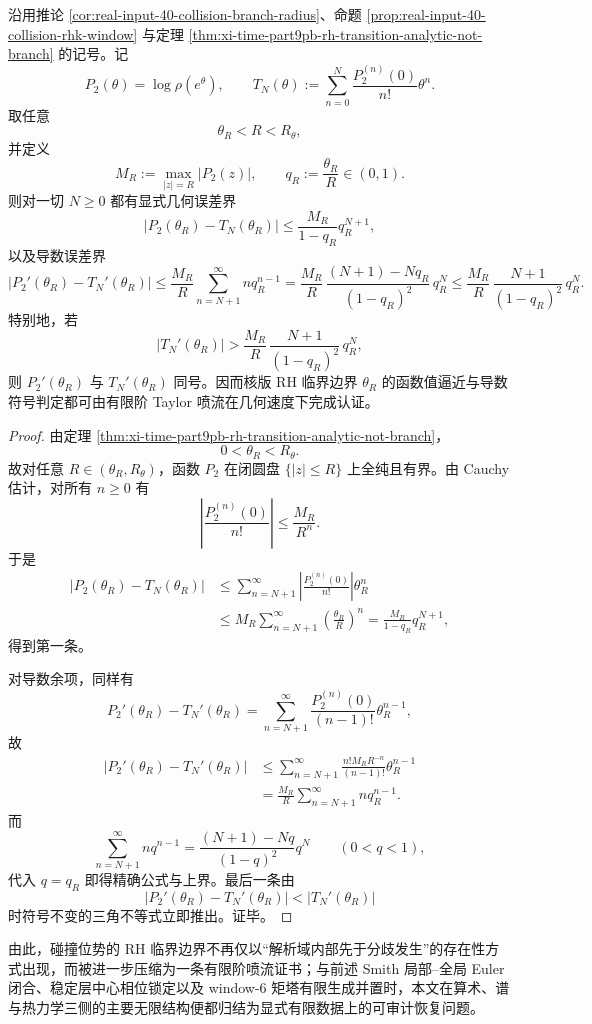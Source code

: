 \begin{theorem}\label{thm:xi-time-part50be-rh-boundary-finite-taylor-jet-certificate}
沿用推论 \ref{cor:real-input-40-collision-branch-radius}、命题 \ref{prop:real-input-40-collision-rhk-window} 与定理 \ref{thm:xi-time-part9pb-rh-transition-analytic-not-branch} 的记号。记
\[
P_2(\theta)=\log\rho(e^\theta),
\qquad
T_N(\theta):=\sum_{n=0}^{N}\frac{P_2^{(n)}(0)}{n!}\theta^n.
\]
取任意
\[
\theta_R<R<R_\theta,
\]
并定义
\[
M_R:=\max_{|z|=R}|P_2(z)|,
\qquad
q_R:=\frac{\theta_R}{R}\in(0,1).
\]
则对一切 \(N\ge 0\) 都有显式几何误差界
\[
\left|P_2(\theta_R)-T_N(\theta_R)\right|
\le
\frac{M_R}{1-q_R}q_R^{N+1},
\]
以及导数误差界
\[
\left|P_2'(\theta_R)-T_N'(\theta_R)\right|
\le
\frac{M_R}{R}\sum_{n=N+1}^{\infty}nq_R^{n-1}
=
\frac{M_R}{R}\,
\frac{(N+1)-Nq_R}{(1-q_R)^2}\,
q_R^{N}
\le
\frac{M_R}{R}\,
\frac{N+1}{(1-q_R)^2}\,
q_R^{N}.
\]
特别地，若
\[
\left|T_N'(\theta_R)\right|
>
\frac{M_R}{R}\,
\frac{N+1}{(1-q_R)^2}\,
q_R^{N},
\]
则 \(P_2'(\theta_R)\) 与 \(T_N'(\theta_R)\) 同号。因而核版 RH 临界边界 \(\theta_R\) 的函数值逼近与导数符号判定都可由有限阶 Taylor 喷流在几何速度下完成认证。
\end{theorem}
\begin{proof}
由定理 \ref{thm:xi-time-part9pb-rh-transition-analytic-not-branch}，
\[
0<\theta_R<R_\theta.
\]
故对任意 \(R\in(\theta_R,R_\theta)\)，函数 \(P_2\) 在闭圆盘 \(\{|z|\le R\}\) 上全纯且有界。由 Cauchy 估计，对所有 \(n\ge 0\) 有
\[
\left|\frac{P_2^{(n)}(0)}{n!}\right|
\le
\frac{M_R}{R^n}.
\]
于是
\[
\begin{aligned}
\left|P_2(\theta_R)-T_N(\theta_R)\right|
&\le
\sum_{n=N+1}^{\infty}
\left|\frac{P_2^{(n)}(0)}{n!}\right|
\theta_R^n\\
&\le
M_R\sum_{n=N+1}^{\infty}\left(\frac{\theta_R}{R}\right)^n
=
\frac{M_R}{1-q_R}q_R^{N+1},
\end{aligned}
\]
得到第一条。

对导数余项，同样有
\[
P_2'(\theta_R)-T_N'(\theta_R)
=
\sum_{n=N+1}^{\infty}
\frac{P_2^{(n)}(0)}{(n-1)!}\theta_R^{n-1},
\]
故
\[
\begin{aligned}
\left|P_2'(\theta_R)-T_N'(\theta_R)\right|
&\le
\sum_{n=N+1}^{\infty}
\frac{n!M_RR^{-n}}{(n-1)!}\theta_R^{n-1}\\
&=
\frac{M_R}{R}\sum_{n=N+1}^{\infty}nq_R^{n-1}.
\end{aligned}
\]
而
\[
\sum_{n=N+1}^{\infty}nq^{n-1}
=
\frac{(N+1)-Nq}{(1-q)^2}q^N
\qquad(0<q<1),
\]
代入 \(q=q_R\) 即得精确公式与上界。最后一条由
\[
\left|P_2'(\theta_R)-T_N'(\theta_R)\right|
<
\left|T_N'(\theta_R)\right|
\]
时符号不变的三角不等式立即推出。证毕。
\end{proof}

\noindent
由此，碰撞位势的 RH 临界边界不再仅以“解析域内部先于分歧发生”的存在性方式出现，而被进一步压缩为一条有限阶喷流证书；与前述 Smith 局部--全局 Euler 闭合、稳定层中心相位锁定以及 window-\(6\) 矩塔有限生成并置时，本文在算术、谱与热力学三侧的主要无限结构便都归结为显式有限数据上的可审计恢复问题。
